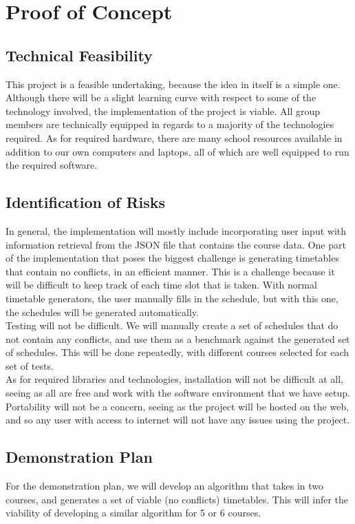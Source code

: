 \documentclass[12pt]{article}
\begin{document}
\newpage
\section{Proof of Concept}
\subsection{Technical Feasibility}
This project is a feasible undertaking, because the idea in itself is a simple one. Although there will be a slight learning curve with respect to some of the technology involved, the implementation of the project is viable. All group members are technically equipped in regards to a majority of the technologies required. As for required hardware, there are many school resources available in addition to our own computers and laptops, all of which are well equipped to run the required software. 

\subsection{Identification of Risks}
In general, the implementation will mostly include incorporating user input with information retrieval from the JSON file that contains the course data. One part of the implementation that poses the biggest challenge is generating timetables that contain no conflicts, in an efficient manner. This is a challenge because it will be difficult to keep track of each time slot that is taken. With normal timetable generators, the user manually fills in the schedule, but with this one, the schedules will be generated automatically. \\

Testing will not be difficult. We will manually create a set of schedules that do not contain any conflicts, and use them as a benchmark against the generated set of schedules. This will be done repeatedly, with different courses selected for each set of tests. \\

As for required libraries and technologies, installation will not be difficult at all, seeing as all are free and work with the software environment that we have setup. Portability will not be a concern, seeing as the project will be hosted on the web, and so any user with access to internet will not have any issues using the project.

\newpage
\subsection{Demonstration Plan}
For the demonstration plan, we will develop an algorithm that takes in two courses, and generates a set of viable (no conflicts) timetables. This will infer the viability of developing a similar algorithm for 5 or 6 courses.
\end{document}
